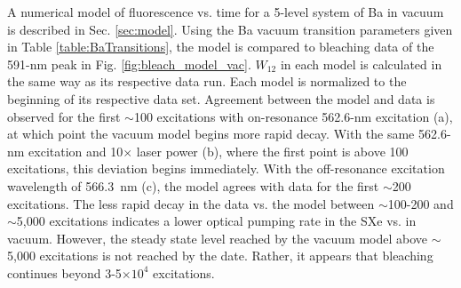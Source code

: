 A numerical model of fluorescence vs. time for a 5-level system of Ba in vacuum is described in Sec. \ref{sec:model}.  Using the Ba vacuum transition parameters given in Table \ref{table:BaTransitions}, the model is compared to bleaching data of the 591-nm peak in Fig. \ref{fig:bleach_model_vac}.  $W_{12}$ in each model is calculated in the same way as its respective data run.  Each model is normalized to the beginning of its respective data set.  Agreement between the model and data is observed for the first $\sim$100 excitations with on-resonance 562.6-nm excitation (a), at which point the vacuum model begins more rapid decay.  With the same 562.6-nm excitation and 10$\times$ laser power (b), where the first point is above 100 excitations, this deviation begins immediately.  With the off-resonance excitation wavelength of 566.3~nm (c), the model agrees with data for the first $\sim$200 excitations.  The less rapid decay in the data vs. the model between $\sim$100-200 and $\sim$5,000 excitations indicates a lower optical pumping rate in the SXe vs. in vacuum.  However, the steady state level reached by the vacuum model above $\sim$5,000 excitations is not reached by the date.  Rather, it appears that bleaching continues beyond 3-5$\times 10^{4}$ excitations.




